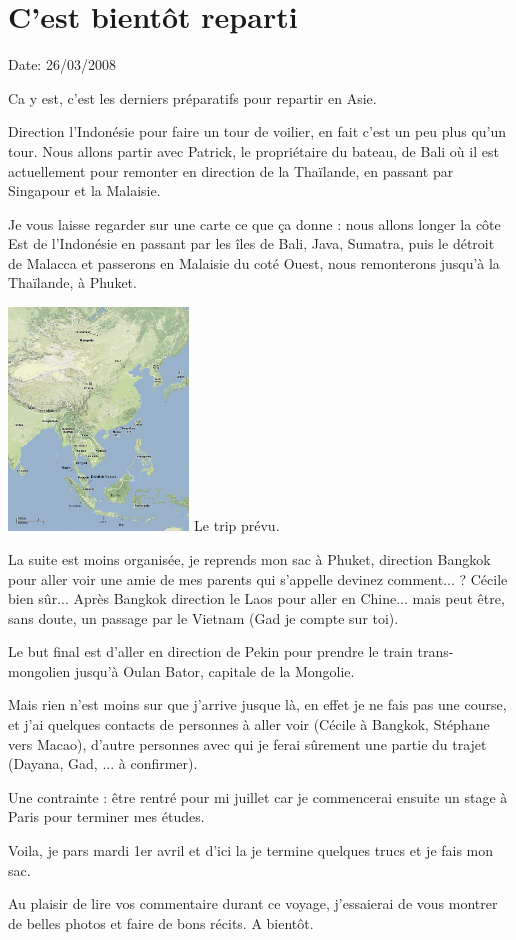 \section{C'est bientôt reparti}

Date: 26/03/2008

\begin{multicols}{2}

Ca y est, c'est les derniers préparatifs pour repartir en Asie.

Direction l'Indonésie pour faire un tour de voilier, en fait c'est un peu plus qu'un tour. Nous allons partir avec Patrick, le propriétaire du bateau, de Bali où il est actuellement pour remonter en direction de la Thaïlande, en passant par Singapour et la Malaisie.

Je vous laisse regarder sur une carte ce que ça donne : nous allons longer la côte Est de l'Indonésie en passant par les îles de Bali, Java, Sumatra, puis le détroit de Malacca et passerons en Malaisie du coté Ouest, nous remonterons jusqu'à la Thaïlande, à Phuket.

\hspace*{-0.65cm}
\includegraphics[width=4.8cm]{articles/C-est-bientot-reparti/trip.png}
Le trip prévu.

La suite est moins organisée, je reprends mon sac à Phuket, direction Bangkok pour aller voir une amie de mes parents qui s'appelle devinez comment... ? Cécile bien sûr... Après Bangkok direction le Laos pour aller en Chine... mais peut être, sans doute, un passage par le Vietnam (Gad je compte sur toi).

Le but final est d'aller en direction de Pekin pour prendre le train trans-mongolien jusqu'à Oulan Bator, capitale de la Mongolie.

Mais rien n'est moins sur que j'arrive jusque là, en effet je ne fais pas une course, et j'ai quelques contacts de personnes à aller voir (Cécile à Bangkok, Stéphane vers Macao), d'autre personnes avec qui je ferai sûrement une partie du trajet (Dayana, Gad, ... à confirmer).

Une contrainte : être rentré pour mi juillet car je commencerai ensuite un stage à Paris pour terminer mes études.

Voila, je pars mardi 1er avril et d'ici la je termine quelques trucs et je fais mon sac.

Au plaisir de lire vos commentaire durant ce voyage, j'essaierai de vous montrer de belles photos et faire de bons récits. A bientôt.

\end{multicols}


